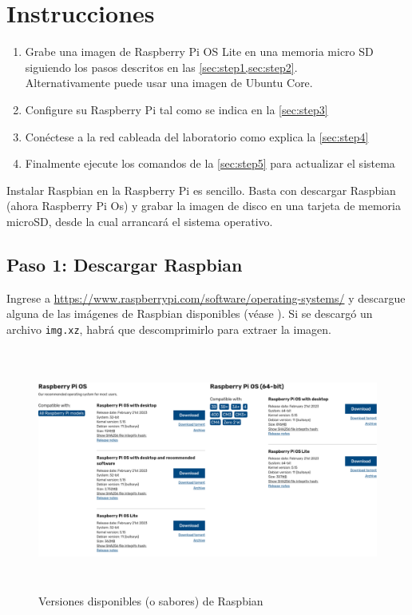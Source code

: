 \documentclass[letterpaper,10.5pt]{article}
\begin{document}
\section{Instrucciones}%
\label{sec:instructions}

\begin{enumerate}[nosep]
	\item Grabe una imagen de Raspberry Pi OS Lite en una memoria micro SD siguiendo los pasos descritos en las \cref{sec:step1,sec:step2}.\\
	Alternativamente puede usar una imagen de Ubuntu Core.
	\item Configure su Raspberry Pi tal como se indica en la \cref{sec:step3}
	\item Conéctese a la red cableada del laboratorio como explica la  \cref{sec:step4}
	\item Finalmente ejecute los comandos de la \cref{sec:step5} para actualizar el sistema
\end{enumerate}

\medskip{}
Instalar Raspbian en la Raspberry Pi es sencillo.
Basta con descargar Raspbian (ahora Raspberry Pi Os) y grabar la imagen de disco en una tarjeta de memoria microSD, desde la cual arrancará el sistema operativo.

%
%
\subsection{Paso 1: Descargar Raspbian}%
\label{sec:step1}
Ingrese a \url{https://www.raspberrypi.com/software/operating-systems/} y descargue alguna de las imágenes de Raspbian disponibles (véase ). Si se descargó un archivo \texttt{img.xz}, habrá que descomprimirlo para extraer la imagen.

\begin{figure}
	\centering%
	\includegraphics[width=0.8\columnwidth,height=8cm,keepaspectratio]{img/p01-01.png} %
	\caption{Versiones disponibles (o sabores) de Raspbian}
	\label{fig:raspbian-flavors} %
\end{figure}
\end{document}
